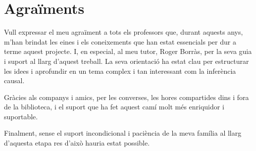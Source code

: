 \documentclass[../../main.tex]{subfiles}
\begin{document}
\chapter*{Agraïments} \label{ch:akw} 

Vull expressar el meu agraïment a tots els professors que, durant aquests anys, m’han brindat les eines i els coneixements que han estat essencials per dur a terme aquest projecte. I, en especial, al meu tutor, Roger Borràs, per la seva guia i suport al llarg d’aquest treball. La seva orientació ha estat clau per estructurar les idees i aprofundir en un tema complex i tan interessant com la inferència causal.

Gràcies als companys i amics, per les converses, les hores compartides dins i fora de la biblioteca, i el suport que ha fet aquest camí molt més enriquidor i suportable.

Finalment, sense el suport incondicional i paciència de la meva família al llarg d’aquesta etapa res d’això hauria estat possible.
\end{document}
